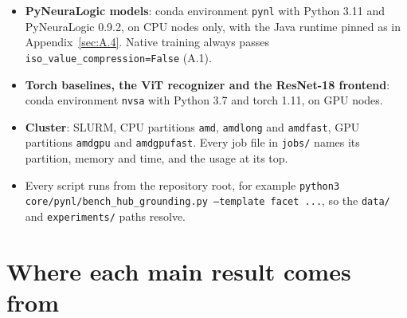 \begin{itemize}
\item \textbf{PyNeuraLogic models}: conda environment \texttt{pynl} with Python 3.11 and PyNeuraLogic 0.9.2, on CPU nodes only, with the Java runtime pinned as in Appendix~\ref{sec:A.4}. Native training always passes \texttt{iso\_value\_compression=False} (A.1).
\item \textbf{Torch baselines, the ViT recognizer and the ResNet-18 frontend}: conda environment \texttt{nvsa} with Python 3.7 and torch 1.11, on GPU nodes.
\item \textbf{Cluster}: SLURM, CPU partitions \texttt{amd}, \texttt{amdlong} and \texttt{amdfast}, GPU partitions \texttt{amdgpu} and \texttt{amdgpufast}. Every job file in \texttt{jobs/} names its partition, memory and time, and the usage at its top.
\item Every script runs from the repository root, for example \texttt{python3 core/pynl/bench\_hub\_grounding.py --template facet ...}, so the \texttt{data/} and \texttt{experiments/} paths resolve.
\end{itemize}

\section{Where each main result comes from}\label{sec:F.2}

